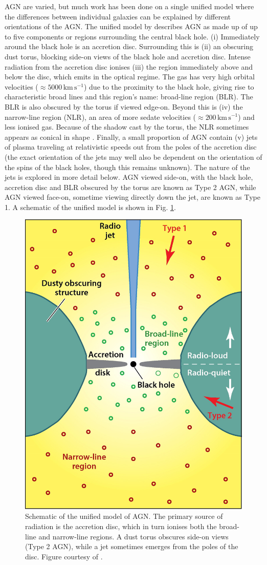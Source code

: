 	AGN are varied, but much work has been done on a single unified model where the differences between individual galaxies can be explained by different orientations of the AGN. The unified model by \citet{Antonucci1993} describes AGN as made up of up to five components or regions surrounding the central black hole. (i) Immediately around the black hole is an accretion disc. Surrounding this is (ii) an obscuring dust torus, blocking side-on views of the black hole and accretion disc. Intense radiation from the accretion disc ionises (iii) the region immediately above and below the disc, which emits in the optical regime. The gas has very high orbital velocities ($\approx 5000 \, \mathrm{km \, s^{-1}}$) due to the proximity to the black hole, giving rise to characteristic broad lines and this region's name: broad-line region (BLR). The BLR is also obscured by the torus if viewed edge-on. Beyond this is (iv) the narrow-line region (NLR), an area of more sedate velocities ($\approx 200 \, \mathrm{km \, s^{-1}}$) and less ionised gas. Because of the shadow cast by the torus, the NLR sometimes appears as conical in shape \citep{Wilson1994}. Finally, a small proportion of AGN contain (v) jets of plasma traveling at relativistic speeds out from the poles of the accretion disc (the exact orientation of the jets may well also be dependent on the orientation of the spins of the black holes, though this remains unknown). The nature of the jets is explored in more detail below. AGN viewed side-on, with the black hole, accretion disc and BLR obscured by the torus are known as Type 2 AGN, while AGN viewed face-on, sometime viewing directly down the jet, are known as Type 1. A schematic of the unified model is shown in Fig. \ref{fig:UnifiedAGN}.

	\begin{figure}
		\centering
		\includegraphics[width=.5\textwidth]{introduction/unifiedAGN.jpeg}
		\caption[Schematic of unified model of AGN]{Schematic of the unified model of AGN. The primary source of radiation is the accretion disc, which in turn ionises both the broad-line and narrow-line regions. A dust torus obscures side-on views (Type 2 AGN), while a jet sometimes emerges from the poles of the disc. Figure courtesy of \citet{Heckman2014}.}
		\label{fig:UnifiedAGN}
	\end{figure}

